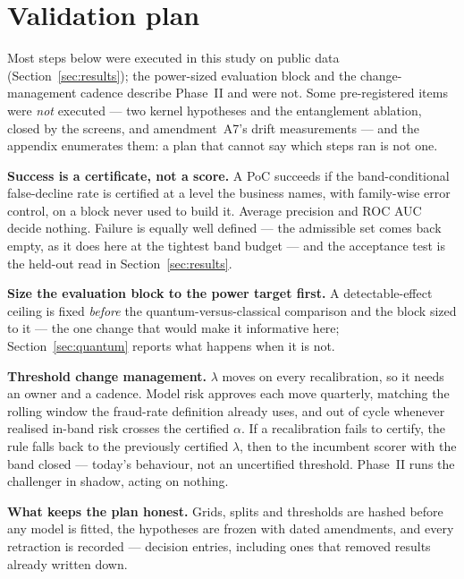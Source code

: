 \section{Validation plan}
\label{sec:validation}

Most steps below were executed in this study on public data
(Section~\ref{sec:results}); the power-sized evaluation block and the change-management cadence
describe Phase~II and were not. Some pre-registered items were \emph{not} executed --- two kernel hypotheses and the
entanglement ablation, closed by the screens, and amendment~A7's drift measurements --- and the appendix enumerates them: a plan that cannot say which steps ran is not one.

\textbf{Success is a certificate, not a score.} A PoC succeeds if the band-conditional
false-decline rate is certified at a level the business names, with family-wise error control,
on a block never used to build it. Average precision and ROC AUC decide nothing. Failure is equally well defined --- the admissible
set comes back empty, as it does here at the tightest band budget --- and the
acceptance test is the held-out read in Section~\ref{sec:results}.

\textbf{Size the evaluation block to the power target first.} A detectable-effect ceiling is
fixed \emph{before} the quantum-versus-classical comparison and the block sized to it --- the
one change that would make it informative here; Section~\ref{sec:quantum} reports
what happens when it is not.

\textbf{Threshold change management.} $\lambda$ moves on every recalibration, so it needs an owner and a cadence. Model risk approves each move quarterly, matching the
rolling window the fraud-rate definition already uses, and out of cycle whenever realised
in-band risk crosses the certified $\alpha$. If a recalibration fails to certify, the rule falls back to the previously certified $\lambda$, then to the incumbent scorer with the band
closed --- today's behaviour, not an uncertified threshold. Phase~II runs the challenger in shadow, acting on nothing.

\textbf{What keeps the plan honest.} Grids, splits and thresholds are hashed before any model is
fitted, the hypotheses are frozen with dated amendments, and every retraction is recorded ---
\ClaimDecisionEntries{} decision entries, including ones that removed results already written
down.
